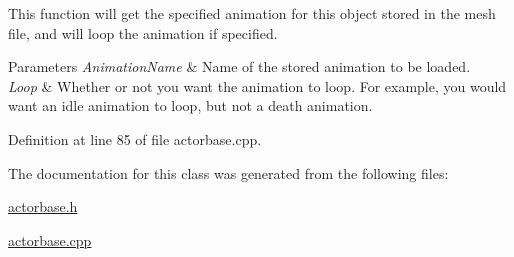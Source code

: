 This function will get the specified animation for this object stored in the mesh file, and will loop the animation if specified. 
\begin{DoxyParams}{Parameters}
{\em AnimationName} & Name of the stored animation to be loaded. \\
\hline
{\em Loop} & Whether or not you want the animation to loop. For example, you would want an idle animation to loop, but not a death animation. \\
\hline
\end{DoxyParams}


Definition at line 85 of file actorbase.cpp.



The documentation for this class was generated from the following files:\begin{DoxyCompactItemize}
\item 
\hyperlink{actorbase_8h}{actorbase.h}\item 
\hyperlink{actorbase_8cpp}{actorbase.cpp}\end{DoxyCompactItemize}
